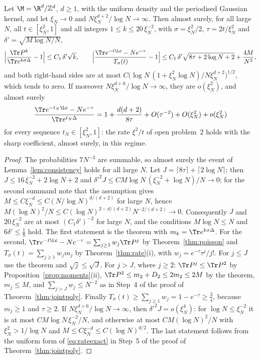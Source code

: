 \begin{corollary}\label{cor:kernel-trace}
Let $\M=\R^d/\mathbb Z^d$, $d\ge1$, with the uniform density and the periodised Gaussian kernel, and let $\xi_N\to0$ and $N\xi_N^{d+2}/\log N\to\infty$. Then almost surely, for all large $N$, all $t\in[\xi_N^2,1]$ and all integers $1\le k\le20\,\xi_N^{-2}$, with $\sigma=\xi_N^2/2$, $\tau=2t/\xi_N^2$ and $\delta'=\sqrt{M\log N/N}$,
\[
\Big|\frac{\Tr P^k}{\Tr e^{k\sigma\Delta}}-1\Big|\le C_1\,\delta'\sqrt k,\qquad\Big|\frac{\Tr e^{-t\Lc}-Ne^{-\tau}}{T_\sigma(t)}-1\Big|\le C_1\,\delta'\sqrt{8\tau+2\log N+2}+\frac{4M}{N^2},
\]
and both right-hand sides are at most $C\big(\log N\,(1+\xi_N^2\log N)/N\xi_N^{d+2}\big)^{1/2}$, which tends to zero. If moreover $N\xi_N^{d+6}/\log N\to\infty$, they are $o(\xi_N^2)$, and almost surely
\[
\frac{\Tr e^{-t_N\Lc}-Ne^{-\tau}}{\Tr e^{t_N\Delta}}=1+\frac{d(d+2)}{8\tau}+O(\tau^{-2})+O(\xi_N^2)+o(\xi_N^2)
\]
for every sequence $t_N\in[\xi_N^2,1]$: the rate $\xi^2/t$ of open problem~2 holds with the sharp coefficient, almost surely, in this regime.
\end{corollary}

\begin{proof}
The probabilities $7N^{-3}$ are summable, so almost surely the event of Lemma~\ref{lem:consistency} holds for all large $N$. Let $J=\lceil8\tau\rceil+\lceil2\log N\rceil$; then $J\le16\,\xi_N^{-2}+2\log N+2$ and $\delta'^2J\le CM\log N\,(\xi_N^{-2}+\log N)/N\to0$; for the second summand note that the assumption gives $M\le C\xi_N^{-d}\le C(N/\log N)^{d/(d+2)}$ for large $N$, hence $M(\log N)^2/N\le C(\log N)^{2-d/(d+2)}N^{-2/(d+2)}\to0$. Consequently $J$ and $20\,\xi_N^{-2}$ are at most $(C_1\delta')^{-2}$ for large $N$, and the conditions $M\log N\le N$ and $6\delta'\le\frac18$ hold. The first statement is the theorem with $m_k=\Tr e^{k\sigma\Delta}$. For the second, $\Tr e^{-t\Lc}-Ne^{-\tau}=\sum_{j\ge1}w_j\Tr P^j$ by Theorem~\ref{thm:poisson} and $T_\sigma(t)=\sum_{j\ge1}w_jm_j$ by Theorem~\ref{thm:rate}(i), with $w_j=e^{-\tau}\tau^j/j!$. For $j\le J$ use the theorem and $\sqrt j\le\sqrt J$. For $j>J$, where $j\ge2$: $\Tr P^j\le\Tr P^2$ by Proposition~\ref{prop:moments}(ii), $\Tr P^2\le m_2+D_2\le2m_2\le2M$ by the theorem, $m_j\le M$, and $\sum_{j>J}w_j\le N^{-2}$ as in Step~4 of the proof of Theorem~\ref{thm:jointpoly}. Finally $T_\sigma(t)\ge\sum_{j\ge1}w_j=1-e^{-\tau}\ge\frac34$, because $m_j\ge1$ and $\tau\ge2$. If $N\xi_N^{d+6}/\log N\to\infty$, then $\delta'^2J=o(\xi_N^4)$: for $\log N\le\xi_N^{-2}$ it is at most $CM\log N\,\xi_N^{-2}/N$, and otherwise at most $CM(\log N)^2/N$ with $\xi_N^2>1/\log N$ and $M\le C\xi_N^{-d}\le C(\log N)^{d/2}$. The last statement follows from the uniform form of \eqref{eq:rateexact} in Step~5 of the proof of Theorem~\ref{thm:jointpoly}.
\end{proof}

